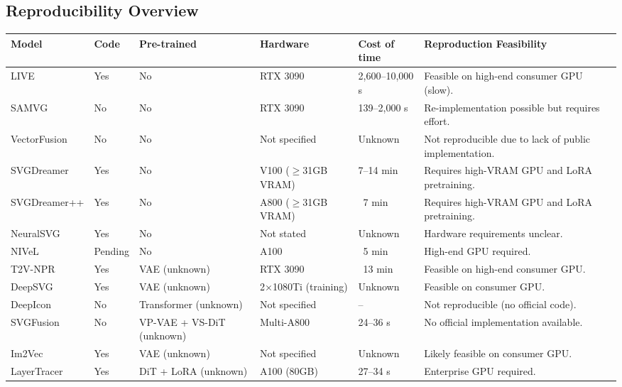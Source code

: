 \begin{landscape}
\thispagestyle{empty}
\centering
\null\vfill
\small
\section*{Reproducibility Overview}

\begin{tabularx}{\linewidth}{l | l | l | l | l | X}
\toprule
\textbf{Model} & 
\textbf{Code} & 
\textbf{Pre-trained} & 
\textbf{Hardware} & 
\textbf{Cost of time} & 
\textbf{Reproduction Feasibility} \\
\midrule

LIVE & Yes & No & RTX 3090 & 2,600--10,000 s & Feasible on high-end consumer GPU (slow). \\ \hline
SAMVG & No & No & RTX 3090 & 139--2,000 s & Re-implementation possible but requires effort. \\ \hline
VectorFusion & No & No & Not specified & Unknown & Not reproducible due to lack of public implementation. \\ \hline
SVGDreamer & Yes & No & V100 ($\geq$31GB VRAM) & 7--14 min & Requires high-VRAM GPU and LoRA pretraining. \\ \hline
SVGDreamer++ & Yes & No & A800 ($\geq$31GB VRAM) & ~7 min & Requires high-VRAM GPU and LoRA pretraining. \\ \hline
NeuralSVG & Yes & No & Not stated & Unknown & Hardware requirements unclear. \\ \hline
NIVeL & Pending & No & A100 & ~5 min & High-end GPU required. \\ \hline
T2V-NPR & Yes & VAE (unknown)& RTX 3090 & ~13 min & Feasible on high-end consumer GPU. \\ \hline
DeepSVG & Yes & VAE (unknown) & 2×1080Ti (training) & Unknown & Feasible on consumer GPU. \\ \hline
DeepIcon & No & Transformer (unknown) & Not specified & -- & Not reproducible (no official code). \\ \hline
SVGFusion & No & VP-VAE + VS-DiT (unknown) & Multi-A800 & 24--36 s & No official implementation available. \\ \hline
Im2Vec & Yes & VAE (unknown) & Not specified & Unknown & Likely feasible on consumer GPU. \\ \hline
LayerTracer & Yes & DiT + LoRA (unknown) & A100 (80GB) & 27--34 s & Enterprise GPU required. \\

\bottomrule

\end{tabularx}


\vfill\null
\end{landscape}





